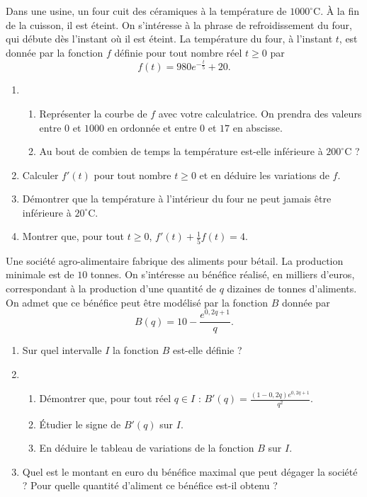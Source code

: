 \documentclass[11pt]{article}
\begin{document}
\begin{exo}
  Dans une usine, un four cuit des céramiques à la température de $1000^\circ$C.
  À la fin de la cuisson, il est éteint. On s'intéresse à la phrase de
  refroidissement du four, qui débute dès l'instant où il est éteint. La
  température du four, à l'instant $t$, est donnée par la fonction $f$ définie
  pour tout nombre réel $t\geq0$ par
  \[
    f(t) = 980e^{-\frac{t}{5}}+20.
  \]
  \begin{enumerate}
    \item \begin{enumerate}
    \item Représenter la courbe de $f$ avec votre calculatrice. On prendra des
      valeurs entre $0$ et $1000$ en ordonnée et entre $0$ et $17$ en abscisse.
    \item Au bout de combien de temps la température est-elle inférieure à
      $200^\circ$C ?
  \end{enumerate}
    \item Calculer $f'(t)$ pour tout nombre $t\geq0$ et en déduire les
      variations de $f$.
    \item Démontrer que la température à l'intérieur du four ne peut jamais être
      inférieure à $20^\circ$C.
    \item Montrer que, pour tout $t\geq0$, $f'(t)+\frac{1}{5}f(t)=4$.
  \end{enumerate}
\end{exo}

\begin{exo}
  Une société agro-alimentaire fabrique des aliments pour bétail. La production
  minimale est de $10$ tonnes. On s'intéresse au bénéfice réalisé, en milliers
  d'euros, correspondant à la production d'une quantité de $q$ dizaines de
  tonnes d'aliments. On admet que ce bénéfice peut être modélisé par la fonction
  $B$ donnée par 
  \[
    B(q) = 10 - \frac{e^{0,2q+1}}{q}.
  \]
  \begin{enumerate}
    \item Sur quel intervalle $I$ la fonction $B$ est-elle définie ?
    \item \begin{enumerate}
        \item Démontrer que, pour tout réel $q\in I$ : $B'(q) =
          \frac{\left( 1-0,2q\right)e^{0,2q+1}}{q^2}$.
        \item Étudier le signe de $B'(q)$ sur $I$.
        \item En déduire le tableau de variations de la fonction $B$ sur $I$.
      \end{enumerate}
        \item Quel est le montant en euro du bénéfice maximal que peut dégager
          la société ? Pour quelle quantité d'aliment ce bénéfice est-il obtenu
          ?
  \end{enumerate}
\end{exo}
\end{document}

